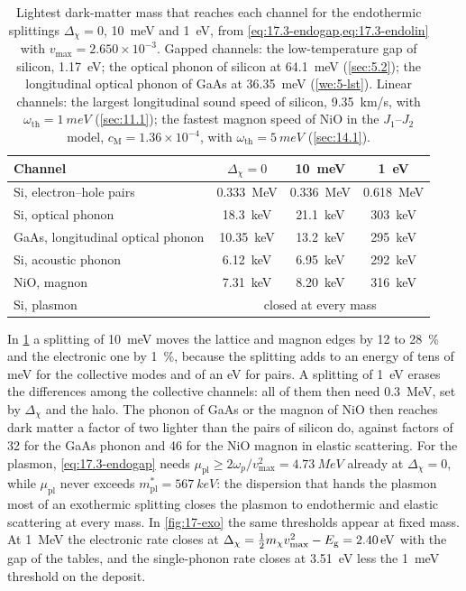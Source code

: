 \begin{table}[tbp]
  \centering
  \caption{Lightest dark-matter mass that reaches each channel for the endothermic splittings $\Delta_\chi = 0$, \SI{10}{meV} and \SI{1}{eV}, from \cref{eq:17.3-endogap,eq:17.3-endolin} with $v_{\mathrm{max}} = 2.650\times10^{-3}$. Gapped channels: the low-temperature gap of silicon, \SI{1.17}{eV}; the optical phonon of silicon at \SI{64.1}{meV} (\cref{sec:5.2}); the longitudinal optical phonon of GaAs at \SI{36.35}{meV} (\cref{we:5-lst}). Linear channels: the largest longitudinal sound speed of silicon, \SI{9.35}{km/s}, with $\omega_{\mathrm{th}} = \SI{1}{meV}$ (\cref{sec:11.1}); the fastest magnon speed of NiO in the $J_1$--$J_2$ model, $c_{\mathrm{M}} = 1.36\times10^{-4}$, with $\omega_{\mathrm{th}} = \SI{5}{meV}$ (\cref{sec:14.1}).}
  \label{tab:17-endo}
  \begin{tabular}{lccc}
    \toprule
    Channel & $\Delta_\chi = 0$ & \SI{10}{meV} & \SI{1}{eV} \\
    \midrule
    Si, electron--hole pairs & \SI{0.333}{MeV} & \SI{0.336}{MeV} & \SI{0.618}{MeV} \\
    Si, optical phonon & \SI{18.3}{keV} & \SI{21.1}{keV} & \SI{303}{keV} \\
    GaAs, longitudinal optical phonon & \SI{10.35}{keV} & \SI{13.2}{keV} & \SI{295}{keV} \\
    Si, acoustic phonon & \SI{6.12}{keV} & \SI{6.95}{keV} & \SI{292}{keV} \\
    NiO, magnon & \SI{7.31}{keV} & \SI{8.20}{keV} & \SI{316}{keV} \\
    Si, plasmon & \multicolumn{3}{c}{closed at every mass} \\
    \bottomrule
  \end{tabular}
\end{table}

In \cref{tab:17-endo} a splitting of \SI{10}{meV} moves the lattice and magnon edges by 12 to \SI{28}{\percent} and the electronic one by \SI{1}{\percent}, because the splitting adds to an energy of tens of meV for the collective modes and of an eV for pairs. A splitting of \SI{1}{eV} erases the differences among the collective channels: all of them then need \SI{0.3}{MeV}, set by $\Delta_\chi$ and the halo. The phonon of GaAs or the magnon of NiO then reaches dark matter a factor of two lighter than the pairs of silicon do, against factors of 32 for the GaAs phonon and 46 for the NiO magnon in elastic scattering. For the plasmon, \cref{eq:17.3-endogap} needs $\mu_{\mathrm{pl}} \ge 2\omega_p/v_{\mathrm{max}}^2 = \SI{4.73}{MeV}$ already at $\Delta_\chi = 0$, while $\mu_{\mathrm{pl}}$ never exceeds $m^*_{\mathrm{pl}} = \SI{567}{keV}$: the dispersion that hands the plasmon most of an exothermic splitting closes the plasmon to endothermic and elastic scattering at every mass. In \cref{fig:17-exo} the same thresholds appear at fixed mass. At \SI{1}{MeV} the electronic rate closes at $\Delta_\chi = \tfrac12m_{\chi} v_{\mathrm{max}}^2 - E_{\mathrm{g}} = \SI{2.40}{eV}$ with the gap of the tables, and the single-phonon rate closes at \SI{3.51}{eV} less the \SI{1}{meV} threshold on the deposit.
